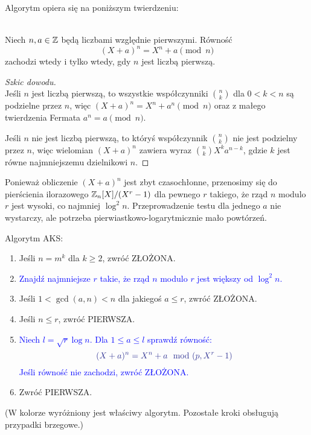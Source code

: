 Algorytm opiera się na poniższym twierdzeniu:

\begin{theorem} \\
Niech \( n, a \in \mathbb{Z} \) będą liczbami względnie pierwszymi. Równość
\[
    (X + a)^n = X^n + a \pmod{n}
\]
zachodzi wtedy i tylko wtedy, gdy \( n \) jest liczbą pierwszą.
\end{theorem}
\begin{proof}[Szkic dowodu]\\
Jeśli \( n \) jest liczbą pierwszą, to wszystkie współczynniki \( n \choose k \) dla \( 0 < k < n \) są podzielne przez \( n \), więc \( (X + a)^n = X^n + a^n \pmod{n} \) oraz z małego twierdzenia Fermata \( a^n = a \pmod{n} \).

Jeśli $n$ nie jest liczbą pierwszą, to któryś współczynnik \( n \choose k \) nie jest podzielny przez \( n \), więc wielomian \( (X + a)^n \) zawiera wyraz \( {n \choose k} X^ka^{n-k} \), gdzie \( k \) jest równe najmniejszemu dzielnikowi \( n \).
\end{proof}

Ponieważ obliczenie \( (X + a)^n \) jest zbyt czasochłonne, przenosimy się do pierścienia ilorazowego \( \mathbb{Z}_n[X]/(X^r - 1) \) dla pewnego \( r \) takiego, że rząd \( n \)
modulo \( r \) jest wysoki, co najmniej \( \log^2n \). Przeprowadzenie testu dla jednego \( a \) nie wystarczy, ale potrzeba pierwiastkowo-logarytmicznie mało powtórzeń.

\newpage
\begin{greyframe}
    Algorytm AKS:
    \begin{enumerate}
        \item Jeśli \( n = m^k \) dla \( k \geq 2 \), zwróć ZŁOŻONA.
        \item \textcolor{Blue}{Znajdź najmniejsze \( r \) takie, że rząd \( n \) modulo \( r \) jest większy od \( \log^2n \).}
        \item Jeśli \( 1 < \gcd(a, n) < n \) dla jakiegoś \( a \leq r \), zwróć ZŁOŻONA.
        \item Jeśli \( n \leq r \), zwróć PIERWSZA.
        \item \textcolor{Blue}{Niech \( l = \sqrt{r}\log n \). Dla \( 1 \leq a \leq l \) sprawdź równość:}
        \[
            \textcolor{Blue}{(X + a)^n = X^n + a \mod (p, X^r-1)}
        \]
        \textcolor{Blue}{Jeśli równość nie zachodzi, zwróć ZŁOŻONA.}
        \item Zwróć PIERWSZA.
    \end{enumerate}
\end{greyframe}
{\small (W kolorze wyróżniony jest właściwy algorytm. Pozostałe kroki obsługują przypadki brzegowe.)}

